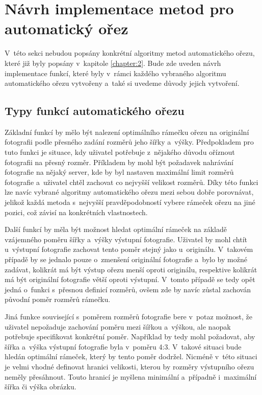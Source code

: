 \section{Návrh implementace metod pro automatický ořez}
\label{sekce:navrh_metody}
V~této sekci nebudou popsány konkrétní algoritmy metod automatického ořezu, které již byly popsány v~kapitole \ref{chapter:2}. Bude zde uveden návrh implementace funkcí, které byly v~rámci každého vybraného algoritmu automatického ořezu vytvořeny a~také si uvedeme důvody jejich vytvoření.

\subsection{Typy funkcí automatického ořezu}
Základní funkcí by mělo být nalezení optimálního rámečku ořezu na originální fotografii podle přesného zadání rozměrů jeho šířky a~výšky. Předpokladem pro tuto funkci je situace, kdy uživatel potřebuje z~nějakého důvodu oříznout fotografii na přesný rozměr. Příkladem by mohl být požadavek nahrávání fotografie na nějaký server, kde by byl nastaven maximální limit rozměrů fotografie a~uživatel chtěl zachovat co nejvyšší velikost rozměrů. Díky této funkci lze navíc vybrané algoritmy automatického ořezu mezi sebou dobře porovnávat, jelikož každá metoda s~nejvyšší pravděpodobností vybere rámeček ořezu na jiné pozici, což závisí na konkrétních vlastnostech.

Další funkcí by měla být možnost hledat optimální rámeček na základě vzájemného poměru šířky a~výšky výstupní fotografie. Uživatel by mohl chtít u~výstupní fotografie zachovat tento poměr stejný jako u~originálu. V~takovém případě by se jednalo pouze o~zmenšení originální fotografie a~bylo by možné zadávat, kolikrát má být výstup ořezu menší oproti originálu, respektive kolikrát má být originální fotografie větší oproti výstupní. V~tomto případě se tedy opět jedná o~funkci s~přesnou definicí rozměrů, ovšem zde by navíc zůstal zachován původní poměr rozměrů rámečku.

Jiná funkce související s~poměrem rozměrů fotografie bere v~potaz možnost, že uživatel nepožaduje zachování poměru mezi šířkou a~výškou, ale naopak potřebuje specifikovat konkrétní poměr. Například by tedy mohl požadovat, aby šířka a~výška výstupní fotografie byla v~poměru 4:3. V~takové situaci bude hledán optimální rámeček, který by tento poměr dodržel. Nicméně v~této situaci je velmi vhodné definovat hranici velikosti, kterou by rozměry výstupního ořezu neměly přesáhnout. Touto hranicí je myšlena minimální a~případně i~maximální šířka či výška obrázku.

